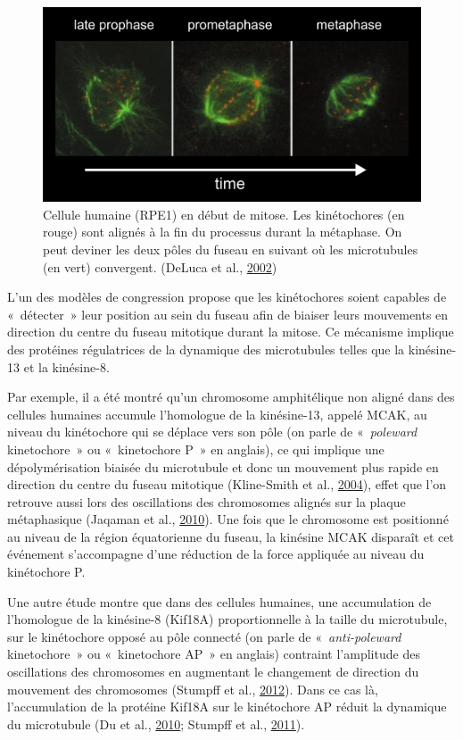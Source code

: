 \documentclass[12pt,a4paper,twoside,openright]{book}
\begin{document}
\begin{figure}[htbp]
\centering
\includegraphics{figures/intro/congression.png}
\caption{\label{fig:congression}Cellule humaine (RPE1) en début de
mitose. Les kinétochores (en rouge) sont alignés à la fin du processus
durant la métaphase. On peut deviner les deux pôles du fuseau en suivant
où les microtubules (en vert) convergent. (DeLuca et al.,
\protect\hyperlink{ref-DeLuca2002}{2002})}
\end{figure}

L'un des modèles de congression propose que les kinétochores soient
capables de «~détecter~» leur position au sein du fuseau afin de biaiser
leurs mouvements en direction du centre du fuseau mitotique durant la
mitose. Ce mécanisme implique des protéines régulatrices de la dynamique
des microtubules telles que la kinésine-13 et la kinésine-8.

Par exemple, il a été montré qu'un chromosome amphitélique non aligné
dans des cellules humaines accumule l'homologue de la kinésine-13,
appelé MCAK, au niveau du kinétochore qui se déplace vers son pôle (on
parle de «~\emph{poleward} kinetochore~» ou «~kinetochore P~» en
anglais), ce qui implique une dépolymérisation biaisée du microtubule et
donc un mouvement plus rapide en direction du centre du fuseau mitotique
(Kline-Smith et al., \protect\hyperlink{ref-Kline-Smith2004}{2004}),
effet que l'on retrouve aussi lors des oscillations des chromosomes
alignés sur la plaque métaphasique (Jaqaman et al.,
\protect\hyperlink{ref-Jaqaman2010}{2010}). Une fois que le chromosome
est positionné au niveau de la région équatorienne du fuseau, la
kinésine MCAK disparaît et cet événement s'accompagne d'une réduction de
la force appliquée au niveau du kinétochore P.

Une autre étude montre que dans des cellules humaines, une accumulation
de l'homologue de la kinésine-8 (Kif18A) proportionnelle à la taille du
microtubule, sur le kinétochore opposé au pôle connecté (on parle de
«~\emph{anti-poleward} kinetochore~» ou «~kinetochore AP~» en anglais)
contraint l'amplitude des oscillations des chromosomes en augmentant le
changement de direction du mouvement des chromosomes (Stumpff et al.,
\protect\hyperlink{ref-Stumpff2012}{2012}). Dans ce cas là,
l'accumulation de la protéine Kif18A sur le kinétochore AP réduit la
dynamique du microtubule (Du et al.,
\protect\hyperlink{ref-Du2010}{2010}; Stumpff et al.,
\protect\hyperlink{ref-Stumpff2011a}{2011}).
\end{document}
